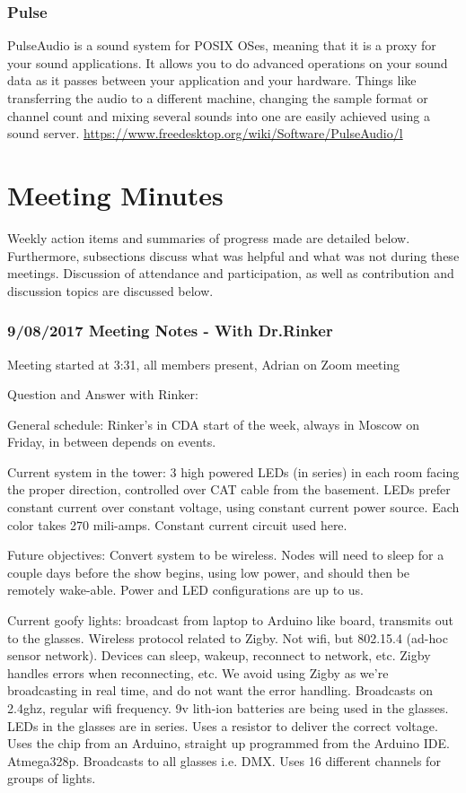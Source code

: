 \documentclass[12pt]{article}
\begin{document}
		\subsubsection{Pulse}
		 PulseAudio is a sound system for POSIX OSes, meaning that it is a proxy for your sound applications. It allows you to do advanced operations on your sound data as it passes between your application and your hardware. Things like transferring the audio to a different machine, changing the sample format or channel count and mixing several sounds into one are easily achieved using a sound server. \url{https://www.freedesktop.org/wiki/Software/PulseAudio/l}
		
	\newpage

\section{Meeting Minutes}
	Weekly action items and summaries of progress made are detailed below. Furthermore, subsections discuss what was helpful and what was not during these meetings. Discussion of attendance and participation, as well as contribution and discussion topics are discussed below.
	
	\subsubsection{9/08/2017 Meeting Notes - With Dr.Rinker}

	Meeting started at 3:31, all members present, Adrian on Zoom meeting

Question and Answer with Rinker:

General schedule: Rinker's in CDA start of the week, always in Moscow on Friday, in between depends on events.

Current system in the tower: 3 high powered LEDs (in series) in each room facing the proper direction, controlled over CAT cable from the basement. LEDs prefer constant current over constant voltage, using constant current power source. Each color takes 270 mili-amps. Constant current circuit used here.

Future objectives: Convert system to be wireless. Nodes will need to sleep for a couple days before the show begins, using low power, and should then be remotely wake-able. Power and LED configurations are up to us.

Current goofy lights: broadcast from laptop to Arduino like board, transmits out to the glasses. Wireless protocol related to Zigby. Not wifi, but 802.15.4 (ad-hoc sensor network). Devices can sleep, wakeup, reconnect to network, etc. Zigby handles errors when reconnecting, etc. We avoid using Zigby as we’re broadcasting in real time, and do not want the error handling. Broadcasts on 2.4ghz, regular wifi frequency. 9v lith-ion batteries are being used in the glasses. LEDs in the glasses are in series. Uses a resistor to deliver the correct voltage. Uses the chip from an Arduino, straight up programmed from the Arduino IDE. Atmega328p. Broadcasts to all glasses i.e. DMX. Uses 16 different channels for groups of lights.
\end{document}
